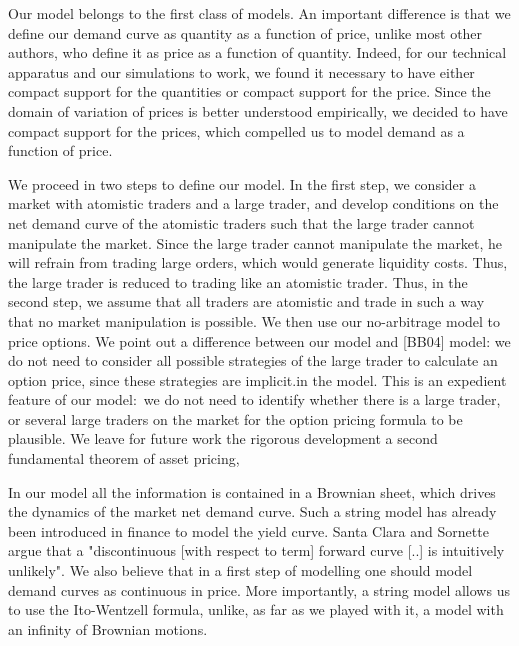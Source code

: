 \documentclass{article}
\begin{document}
Our model belongs to the first class of models. An important difference is
that we define our demand curve as quantity as a function of price, unlike
most other authors, who define it as price as a function of quantity.
Indeed, for our technical apparatus and our simulations to work, we found it
necessary to have either compact support for the quantities or compact
support for the price. Since the domain of variation of prices is better
understood empirically, we decided to have compact support for the prices,
which compelled us to model demand as a function of price.

We proceed in two steps to define our model. In the first step, we consider
a market with atomistic traders and a large trader, and develop conditions
on the net demand curve of the atomistic traders such that the large trader
cannot manipulate the market. Since the large trader cannot manipulate the
market, he will refrain from trading large orders, which would generate
liquidity costs. Thus, the large trader is reduced to trading like an
atomistic trader. Thus, in the second step, we assume that all traders are
atomistic and trade in such a way that no market manipulation is possible.
We then use our no-arbitrage model to price options. We point out a
difference between our model and [BB04] model: we do not need to consider
all possible strategies of the large trader to calculate an option price,
since these strategies are implicit.in the model. This is an expedient
feature of our model:\ we do not need to identify whether there is a large
trader, or several large traders on the market for the option pricing
formula to be plausible. We leave for future work the rigorous development a
second fundamental theorem of asset pricing,

In our model all the information is contained in a Brownian sheet, which
drives the dynamics of the market net demand curve. Such a string model has
already been introduced in finance to model the yield curve. Santa Clara and
Sornette argue that a "discontinuous [with respect to term] forward curve
[..] is intuitively unlikely". We also believe that in a first step of
modelling one should model demand curves as continuous in price. More
importantly, a string model allows us to use the Ito-Wentzell formula,
unlike, as far as we played with it, a model with an infinity of Brownian
motions.
\end{document}

